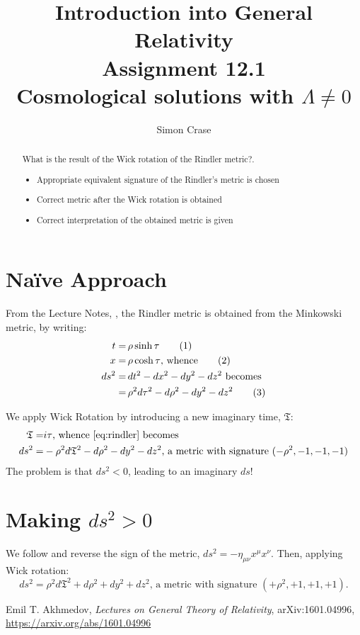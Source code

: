 \documentclass[]{article}
\title{Introduction into General Relativity\\Assignment 12.1\\Cosmological solutions with $\Lambda\ne 0$}
\author{Simon Crase}
\newcommand\numberthis{\addtocounter{equation}{1}\tag{\theequation}}
\begin{document}
\maketitle

\begin{abstract}
What is the result of the Wick rotation of the Rindler metric?.
\begin{itemize}
	\item  Appropriate equivalent signature of the Rindler's metric is chosen
	\item  Correct metric after the Wick rotation is obtained
	\item  Correct interpretation of the obtained metric is given
\end{itemize}
\end{abstract}

\section{Na\"ive Approach}
From the Lecture Notes, \cite[I, (9) \& (10)]{Akhmedov2017}, the Rindler metric is obtained from the Minkowski metric, by writing:
\begin{align*}
t=&\, \rho \sinh \tau \numberthis\label{eq:t_tau}\\
x=&\, \rho \cosh \tau \text{, whence} \numberthis\label{eq:r_rho}\\
ds^2 =&\, dt^2-dx^2-dy^2-dz^2\text{ becomes}\\
=&\, \rho^2 d\tau^2 - d\rho ^2 -dy^2-dz^2\numberthis\label{eq:rindler}
\end{align*}

We apply Wick Rotation by introducing a new imaginary time, $\mathfrak{T}$:
\begin{align*}
\mathfrak{T}=&i\tau\text{, whence \eqref{eq:rindler} becomes}\\
ds^2 =& -\rho^2 d\mathfrak{T}^2 - d\rho^2-dy^2-dz^2\text{, a metric with signature $(-\rho^2,-1,-1,-1)$}
\end{align*}
The problem is that $ds^2<0$, leading to an imaginary $ds$!

\section{Making $ds^2>0$}
We follow \cite[XII,(324)]{Akhmedov2017} and reverse the sign of the metric, $ds^2=-\eta_{\mu\nu}x^{\mu}x^{\nu}$. Then, applying Wick rotation:
\begin{equation*}
ds^2 = \rho^2 d\mathfrak{T}^2 + d\rho^2+dy^2+dz^2\text{, a metric with signature $(+\rho^2,+1,+1,+1)$}.
\end{equation*}
\begin{thebibliography}{9}\label{section:biblio}
	\raggedright
	Emil T. Akhmedov,
	\emph{Lectures on General Theory of Relativity},
	arXiv:1601.04996,
	\url{https://arxiv.org/abs/1601.04996}
\end{thebibliography}
\end{document}
